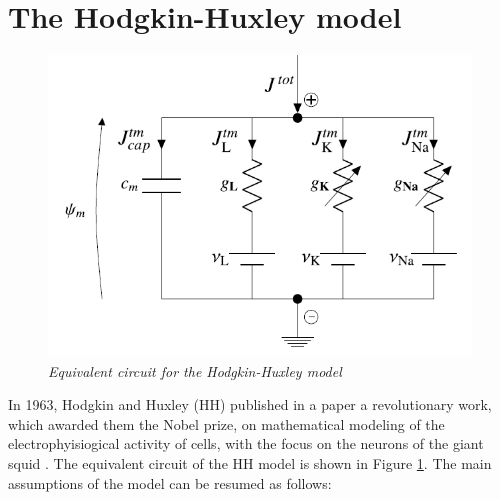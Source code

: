 \documentclass[12pt, a4paper]{report}
\begin{document}
\section{The Hodgkin-Huxley model}

\begin{figure}[H]
	\begin{center}
		\includegraphics[scale=0.7]{HH.png} 
	\end{center} 
	\caption{\textit{Equivalent circuit for the Hodgkin-Huxley model}} \label{HH}
	
\end{figure}


In 1963, Hodgkin and Huxley (HH) published in a paper a revolutionary work, which awarded them the Nobel prize, on mathematical modeling of the electrophyisiogical activity of cells, with the focus on the neurons of the giant squid \cite{37}.  %
The equivalent circuit of the HH model is shown in Figure \ref{HH}. The main assumptions of the model can be resumed as follows:
\end{document}

